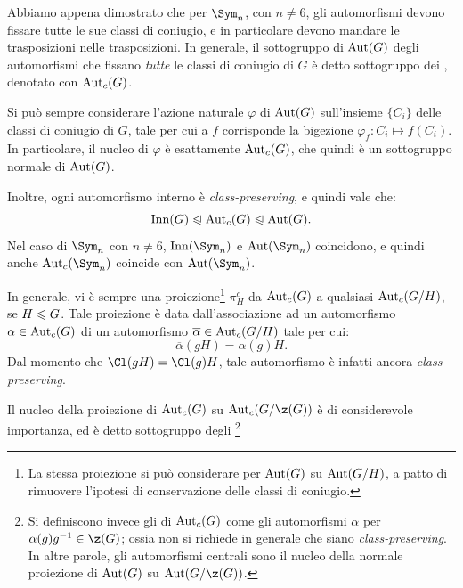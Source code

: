 \documentclass[11pt]{scrartcl}
\begin{document}
	\begin{approf}
		Abbiamo appena dimostrato che per $\Sym_n$, con $n \neq 6$, gli automorfismi
		devono fissare tutte le sue classi di coniugio, e in particolare devono
		mandare le trasposizioni nelle trasposizioni. In generale, il sottogruppo
		di $\operatorname{Aut}(G)$ degli automorfismi che fissano \textit{tutte} le classi
		di coniugio di $G$ è detto sottogruppo dei , denotato con $\operatorname{Aut}_c(G)$. \medskip
		
		
		Si può sempre considerare l'azione naturale $\varphi$ di $\operatorname{Aut}(G)$ sull'insieme $\{C_i\}$ delle
		classi di coniugio di $G$, tale per cui a $f$ corrisponde la bigezione
		$\varphi_f : C_i \mapsto f(C_i)$. In particolare, il nucleo di $\varphi$ è
		esattamente $\operatorname{Aut}_c(G)$, che quindi è un sottogruppo normale di $\operatorname{Aut}(G)$. \medskip
		
		
		Inoltre, ogni automorfismo interno è \textit{class-preserving}, e quindi
		vale che:
		\[ \operatorname{Inn}(G) \trianglelefteqslant \operatorname{Aut}_c(G) \trianglelefteqslant \operatorname{Aut}(G). \]
		Nel caso di $\Sym_n$ con $n \neq 6$, $\Inn(\Sym_n)$ e
		$\Aut(\Sym_n)$ coincidono, e quindi anche $\Aut_c(\Sym_n)$ coincide
		con $\Aut(\Sym_n)$. \medskip
		
		
		In generale, vi è sempre una proiezione\footnote{
			La stessa proiezione si può considerare per $\operatorname{Aut}(G)$ su
			$\operatorname{Aut}(G/H)$, a patto di rimuovere l'ipotesi di
			conservazione delle classi di coniugio.
		} $\pi_{H}^c$ da $\operatorname{Aut}_c(G)$ a qualsiasi
		$\operatorname{Aut}_c(G/H)$, se $H \trianglelefteqslant G$. Tale proiezione è data
		dall'associazione ad un automorfismo $\alpha \in \operatorname{Aut}_c(G)$ di
		un automorfismo $\overline{\alpha} \in \operatorname{Aut}_c(G/H)$ tale per cui:
		\[ \overline{\alpha}(gH) = \alpha(g)H. \]
		Dal momento che $\Cl(gH) = \Cl(g) H$, tale automorfismo è infatti
		ancora \textit{class-preserving}. \medskip
		
		
		Il nucleo della proiezione di $\operatorname{Aut}_c(G)$ su $\Aut_c(G/\z(G))$ è
		di considerevole importanza, ed è detto sottogruppo degli
		\footnote{
			Si definiscono invece gli  di $\operatorname{Aut}_c(G)$ come
			gli automorfismi $\alpha$ per $\alpha(g) g\inv \in \z(G)$; ossia
			non si richiede in generale che siano \textit{class-preserving}. In
			altre parole, gli automorfismi centrali sono il nucleo della
			normale proiezione di $\operatorname{Aut}(G)$ su $\Aut(G/\z(G))$.
			
}
\end{approf}
\end{document}
